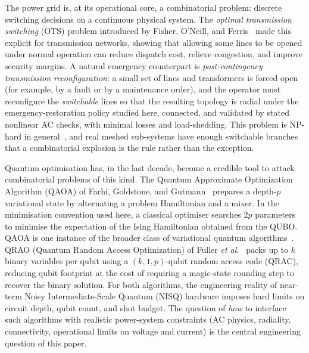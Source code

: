 \documentclass[5p,twocolumn,number,sort&compress,nopreprintline]{elsarticle}
\begin{document}
The power grid is, at its operational core, a combinatorial problem:
discrete switching decisions on a continuous physical system. The
\emph{optimal transmission switching} (OTS) problem introduced by
Fisher, O'Neill, and Ferris~\cite{fisher2008ots} made this explicit
for transmission networks, showing that allowing some lines to be
opened under normal operation can reduce dispatch cost, relieve
congestion, and improve security margins. A natural emergency
counterpart is \emph{post-contingency transmission reconfiguration}: a
small set of lines and transformers is forced open (for example, by a fault or
by a maintenance order), and the operator must reconfigure the
\emph{switchable} lines so that the resulting topology is radial under
the emergency-restoration policy studied here, connected, and validated
by stated nonlinear AC checks, with minimal
losses and load-shedding.
This problem is NP-hard in general~\cite{fisher2008ots}, and real
meshed sub-systems have enough switchable branches that a combinatorial
explosion is the rule rather than the exception.

Quantum optimisation has, in the last decade, become a credible tool
to attack combinatorial problems of this kind. The Quantum
Approximate Optimization Algorithm (QAOA) of Farhi, Goldstone, and
Gutmann~\cite{farhi2014qaoa} prepares a depth-$p$ variational state by
alternating a problem Hamiltonian and a mixer. In the minimisation
convention used here, a classical optimiser searches $2p$ parameters
to minimise the expectation of the Ising Hamiltonian obtained from the
QUBO. QAOA is one instance of the broader class of variational quantum
algorithms~\cite{cerezo2021vqa}. QRAO
(Quantum Random Access Optimization) of Fuller \emph{et
al.}~\cite{fuller2024qrao} packs up to $k$ binary variables per qubit
using a $(k,1,p)$-qubit random access code (QRAC), reducing qubit
footprint at the cost of requiring a magic-state rounding step to
recover the binary solution. For both algorithms, the engineering
reality of near-term Noisy Intermediate-Scale Quantum (NISQ) hardware
imposes hard limits on circuit depth, qubit count, and shot budget.
The question of \emph{how} to interface such algorithms with realistic
power-system constraints (AC physics, radiality, connectivity,
operational limits on voltage and current) is the central engineering
question of this paper.
\end{document}
